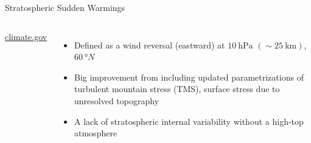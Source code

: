 \documentclass[xcolor=dvipsnames]{beamer} %
\begin{document}
\begin{frame}{Stratospheric Sudden Warmings}
  \begin{columns}
    \centering
    {\tiny\href{https://www.climate.gov/news-features/blogs/enso/polar-vortex-going-make-you-put-sweater-be-afraid-be-very-afraid\#:~:text=Thus\%2C\%20the\%20tropospheric\%20polar\%20vortex,that\%20separates\%20the\%20air\%20masses.}{climate.gov}}
    \begin{itemize}
      \item Defined as a wind reversal (eastward) at $ \SI{10}{\hecto\pascal} $ $ (\sim\SI{25}{\kilo\metre}) $, $ \SI{60}{\degree N} $
      \item Big improvement from including updated parametrizations of turbulent
            mountain stress (TMS), surface stress due to unresolved topography %
      \item A lack of stratospheric internal variability without a high-top atmosphere %
    \end{itemize}
  \end{columns}
\end{frame}
\end{document}
